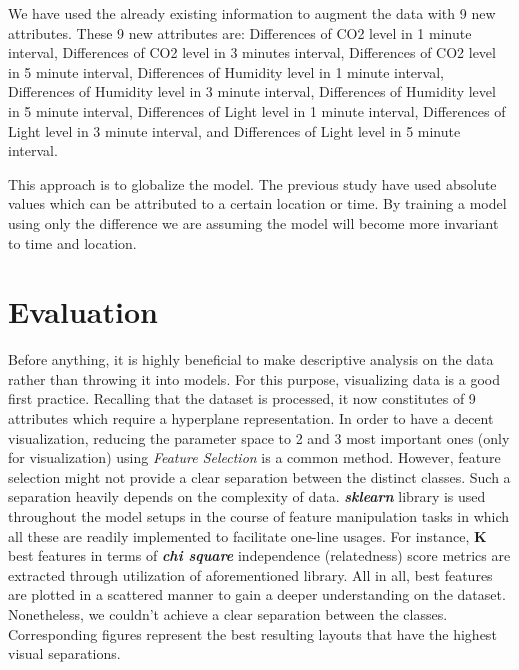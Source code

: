 \documentclass[conference]{IEEEtran}
\begin{document}
We have used the already existing information to augment the data with 9 new attributes. These 9 new attributes are: Differences of CO2 level in 1 minute interval, Differences of CO2 level in 3 minutes interval, Differences of CO2 level in 5 minute interval, Differences of Humidity level in 1 minute interval, Differences of Humidity level in 3 minute interval, Differences of Humidity level in 5 minute interval, Differences of Light level in 1 minute interval, Differences of Light level in 3 minute interval, and Differences of Light level in 5 minute interval.

This approach is to globalize the model. The previous study \cite{Pedersen} have used absolute values which can be attributed to a certain location or time. By training a model using only the difference we are assuming the model will become more invariant to time and location.


\section{Evaluation}
Before anything, it is highly beneficial to make descriptive analysis on the data rather than throwing it into models. For this purpose, visualizing data is a good first practice. Recalling that the dataset is processed, it now constitutes of 9 attributes which require a hyperplane representation. In order to have a decent visualization, reducing the parameter space to 2 and 3 most important ones (only for visualization) using \textit{Feature Selection}\cite{Guyon} is a common method. However, feature selection might not provide a clear separation between the distinct classes. Such a separation heavily depends on the complexity of data. \textit{\textbf{sklearn}} library is used throughout the model setups in the course of feature manipulation tasks in which all these are readily implemented to facilitate one-line usages. For instance, \textbf{K} best features in terms of \textit{\textbf{chi square}}\cite{Fahim} independence (relatedness) score metrics are extracted through utilization of aforementioned library. All in all, best features are plotted in a scattered manner to gain a deeper understanding on the dataset. Nonetheless, we couldn't achieve a clear separation between the classes. Corresponding figures represent the best resulting layouts that have the highest visual separations.
\end{document}

